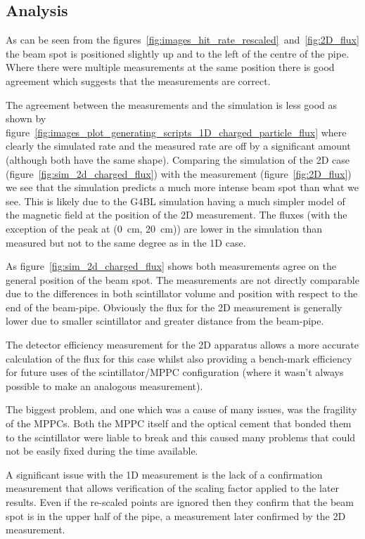 \subsection{Analysis} %
\label{sec:analysis}
As can be seen from the figures~\ref{fig:images_hit_rate_rescaled}~and~\ref{fig:2D_flux} the beam spot is positioned slightly up and to the left of the centre of the pipe. Where there were multiple measurements at the same position there is good agreement which suggests that the measurements are correct.

The agreement between the measurements and the simulation is less good as shown by figure~\ref{fig:images_plot_generating_scripts_1D_charged_particle_flux} where clearly the simulated rate and the measured rate are off by a significant amount (although both have the same shape). Comparing the simulation of the 2D case (figure~\ref{fig:sim_2d_charged_flux}) with the measurement (figure~\ref{fig:2D_flux}) we see that the simulation predicts a much more intense beam spot than what we see. This is likely due to the G4BL simulation having a much simpler model of the magnetic field at the position of the 2D measurement. The fluxes (with the exception of the peak at (0~cm, 20~cm)) are lower in the simulation than measured but not to the same degree as in the 1D case.

As figure~\ref{fig:sim_2d_charged_flux} shows both measurements agree on the general position of the beam spot. The measurements are not directly comparable due to the differences in both scintillator volume and position with respect to the end of the beam-pipe. Obviously the flux for the 2D measurement is generally lower due to smaller scintillator and greater distance from the beam-pipe.

The detector efficiency measurement for the 2D apparatus allows a more accurate calculation of the flux for this case whilst also providing a bench-mark efficiency for future uses of the scintillator/MPPC configuration (where it wasn't always possible to make an analogous measurement). 

The biggest problem, and one which was a cause of many issues, was the fragility of the MPPCs. Both the MPPC itself and the optical cement that bonded them to the scintillator were liable to break and this caused many problems that could not be easily fixed during the time available. 

A significant issue with the 1D measurement is the lack of a confirmation measurement that allows verification of the scaling factor applied to the later results. Even if the re-scaled points are ignored then they confirm that the beam spot is in the upper half of the pipe, a measurement later confirmed by the 2D measurement. 

